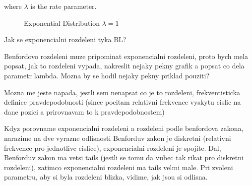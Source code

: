 where $\lambda$ is the rate parameter. \cite{Marek2024}

\begin{figure}[h]
    \centering
    \caption{Exponential Distribution $\lambda = 1$}
    \label{fig:Exp1}
\end{figure}

\begin{koment}
    Jak se exponencialni rozdeleni tyka BL? 

    Benfordovo rozdeleni muze pripominat exponencialni rozdeleni, proto bych mela popsat, jak to rozdeleni vypada, nakreslit nejaky pekny grafik a popsat co dela parametr lambda. Mozna by se hodil nejaky pekny priklad pouziti? 

    Mozna me jeste napada, jestli sem nenapsat co je to rozdeleni, frekventisticka definice pravdepodobnosti (since pocitam relativni frekvence vyskytu cislic na dane pozici a prirovnavam to k pravdepodobnostem) 
\end{koment}

Kdyz porovname exponencialni rozdeleni a rozdeleni podle benfordova zakona, narazime na dve vyrazne odlisnosti 
Benforduv zakon je diskretni (relativni frekvence pro jednotlive cislice), exponencialni rozdeleni je spojite. Dal, Benforduv zakon ma vetsi tails (jestli se tomu da vubec tak rikat pro diskretni rozdeleni), zatimco exponencialni rozdeleni ma tails velmi male. Pri zvoleni parametru, aby si byla rozdeleni blizka, vidime, jak jsou si odlisna. 

